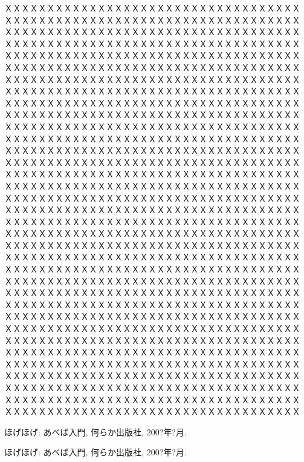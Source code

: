 \documentclass[]{ltjsarticle}
\begin{document}
ＸＸＸＸＸＸＸＸＸＸＸＸＸＸＸＸＸＸＸＸＸＸＸＸＸＸＸＸＸＸＸＸＸＸＸ
ＸＸＸＸＸＸＸＸＸＸＸＸＸＸＸＸＸＸＸＸＸＸＸＸＸＸＸＸＸＸＸＸＸＸＸ
ＸＸＸＸＸＸＸＸＸＸＸＸＸＸＸＸＸＸＸＸＸＸＸＸＸＸＸＸＸＸＸＸＸＸＸ
ＸＸＸＸＸＸＸＸＸＸＸＸＸＸＸＸＸＸＸＸＸＸＸＸＸＸＸＸＸＸＸＸＸＸＸ
ＸＸＸＸＸＸＸＸＸＸＸＸＸＸＸＸＸＸＸＸＸＸＸＸＸＸＸＸＸＸＸＸＸＸＸ
ＸＸＸＸＸＸＸＸＸＸＸＸＸＸＸＸＸＸＸＸＸＸＸＸＸＸＸＸＸＸＸＸＸＸＸ
ＸＸＸＸＸＸＸＸＸＸＸＸＸＸＸＸＸＸＸＸＸＸＸＸＸＸＸＸＸＸＸＸＸＸＸ
ＸＸＸＸＸＸＸＸＸＸＸＸＸＸＸＸＸＸＸＸＸＸＸＸＸＸＸＸＸＸＸＸＸＸＸ
ＸＸＸＸＸＸＸＸＸＸＸＸＸＸＸＸＸＸＸＸＸＸＸＸＸＸＸＸＸＸＸＸＸＸＸ
ＸＸＸＸＸＸＸＸＸＸＸＸＸＸＸＸＸＸＸＸＸＸＸＸＸＸＸＸＸＸＸＸＸＸＸ
ＸＸＸＸＸＸＸＸＸＸＸＸＸＸＸＸＸＸＸＸＸＸＸＸＸＸＸＸＸＸＸＸＸＸＸ
ＸＸＸＸＸＸＸＸＸＸＸＸＸＸＸＸＸＸＸＸＸＸＸＸＸＸＸＸＸＸＸＸＸＸＸ
ＸＸＸＸＸＸＸＸＸＸＸＸＸＸＸＸＸＸＸＸＸＸＸＸＸＸＸＸＸＸＸＸＸＸＸ
ＸＸＸＸＸＸＸＸＸＸＸＸＸＸＸＸＸＸＸＸＸＸＸＸＸＸＸＸＸＸＸＸＸＸＸ
ＸＸＸＸＸＸＸＸＸＸＸＸＸＸＸＸＸＸＸＸＸＸＸＸＸＸＸＸＸＸＸＸＸＸＸ
ＸＸＸＸＸＸＸＸＸＸＸＸＸＸＸＸＸＸＸＸＸＸＸＸＸＸＸＸＸＸＸＸＸＸＸ
ＸＸＸＸＸＸＸＸＸＸＸＸＸＸＸＸＸＸＸＸＸＸＸＸＸＸＸＸＸＸＸＸＸＸＸ
ＸＸＸＸＸＸＸＸＸＸＸＸＸＸＸＸＸＸＸＸＸＸＸＸＸＸＸＸＸＸＸＸＸＸＸ
ＸＸＸＸＸＸＸＸＸＸＸＸＸＸＸＸＸＸＸＸＸＸＸＸＸＸＸＸＸＸＸＸＸＸＸ
ＸＸＸＸＸＸＸＸＸＸＸＸＸＸＸＸＸＸＸＸＸＸＸＸＸＸＸＸＸＸＸＸＸＸＸ
ＸＸＸＸＸＸＸＸＸＸＸＸＸＸＸＸＸＸＸＸＸＸＸＸＸＸＸＸＸＸＸＸＸＸＸ
ＸＸＸＸＸＸＸＸＸＸＸＸＸＸＸＸＸＸＸＸＸＸＸＸＸＸＸＸＸＸＸＸＸＸＸ
ＸＸＸＸＸＸＸＸＸＸＸＸＸＸＸＸＸＸＸＸＸＸＸＸＸＸＸＸＸＸＸＸＸＸＸ
ＸＸＸＸＸＸＸＸＸＸＸＸＸＸＸＸＸＸＸＸＸＸＸＸＸＸＸＸＸＸＸＸＸＸＸ
ＸＸＸＸＸＸＸＸＸＸＸＸＸＸＸＸＸＸＸＸＸＸＸＸＸＸＸＸＸＸＸＸＸＸＸ
ＸＸＸＸＸＸＸＸＸＸＸＸＸＸＸＸＸＸＸＸＸＸＸＸＸＸＸＸＸＸＸＸＸＸＸ
ＸＸＸＸＸＸＸＸＸＸＸＸＸＸＸＸＸＸＸＸＸＸＸＸＸＸＸＸＸＸＸＸＸＸＸ
ＸＸＸＸＸＸＸＸＸＸＸＸＸＸＸＸＸＸＸＸＸＸＸＸＸＸＸＸＸＸＸＸＸＸＸ
ＸＸＸＸＸＸＸＸＸＸＸＸＸＸＸＸＸＸＸＸＸＸＸＸＸＸＸＸＸＸＸＸＸＸＸ
ＸＸＸＸＸＸＸＸＸＸＸＸＸＸＸＸＸＸＸＸＸＸＸＸＸＸＸＸＸＸＸＸＸＸＸ
ＸＸＸＸＸＸＸＸＸＸＸＸＸＸＸＸＸＸＸＸＸＸＸＸＸＸＸＸＸＸＸＸＸＸＸ
ＸＸＸＸＸＸＸＸＸＸＸＸＸＸＸＸＸＸＸＸＸＸＸＸＸＸＸＸＸＸＸＸＸＸＸ
ＸＸＸＸＸＸＸＸＸＸＸＸＸＸＸＸＸＸＸＸＸＸＸＸＸＸＸＸＸＸＸＸＸＸＸ
ＸＸＸＸＸＸＸＸＸＸＸＸＸＸＸＸＸＸＸＸＸＸＸＸＸＸＸＸＸＸＸＸＸＸＸ
ＸＸＸＸＸＸＸＸＸＸＸＸＸＸＸＸＸＸＸＸＸＸＸＸＸＸＸＸＸＸＸＸＸＸＸ
\cite{publication1,hogehoge}


\begin{thepubbibliography}{99}

 ほげほげ: あべば入門, 何らか出版社, 200?年?月.

\end{thepubbibliography}

\begin{thebibliography}{99}
\label{sannkoubunnkenn_chapter}

ほげほげ: あべば入門, 何らか出版社, 200?年?月.

\end{thebibliography}
\end{document}
